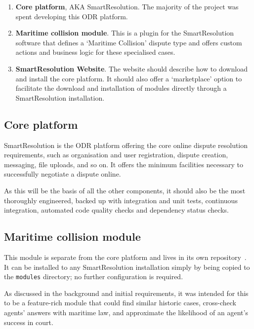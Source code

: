 \begin{enumerate}
    \item \textbf{Core platform}, AKA SmartResolution. The majority of the project was spent developing this ODR platform.
    
    \item \textbf{Maritime collision module}. This is a plugin for the SmartResolution software that defines a `Maritime Collision' dispute type and offers custom actions and business logic for these specialised cases.
    
    \item \textbf{SmartResolution Website}. The website should describe how to download and install the core platform. It should also offer a `marketplace' option to facilitate the download and installation of modules directly through a SmartResolution installation.
\end{enumerate}

\subsection{Core platform}

SmartResolution is the ODR platform offering the core online dispute resolution requirements, such as organisation and user registration, dispute creation, messaging, file uploads, and so on. It offers the minimum facilities necessary to successfully negotiate a dispute online.

As this will be the basis of all the other components, it should also be the most thoroughly engineered, backed up with integration and unit tests, continuous integration, automated code quality checks and dependency status checks.

\subsection{Maritime collision module}

This module is separate from the core platform and lives in its own repository~\cite{repo:module}. It can be installed to any SmartResolution installation simply by being copied to the \lstinline{modules} directory; no further configuration is required.

As discussed in the background and initial requirements, it was intended for this to be a feature-rich module that could find similar historic cases, cross-check agents' answers with maritime law, and approximate the likelihood of an agent's success in court.

